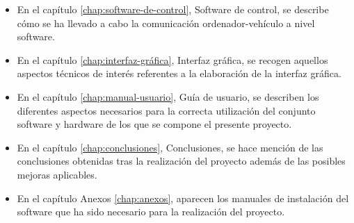 \begin{itemize}
\item En el capítulo \ref{chap:software-de-control}, Software de control, se describe cómo se ha llevado a cabo la comunicación ordenador-vehículo a nivel software.

\item En el capítulo \ref{chap:interfaz-gráfica}, Interfaz gráfica, se recogen aquellos aspectos técnicos de interés referentes a la elaboración de la interfaz gráfica.

\item En el capítulo \ref{chap:manual-usuario}, Guía de usuario, se describen los diferentes aspectos necesarios para la correcta utilización del conjunto software y hardware de los que se compone el presente proyecto.

\item En el capítulo \ref{chap:conclusiones}, Conclusiones, se hace mención de las conclusiones obtenidas tras la realización del proyecto además de las posibles mejoras aplicables.

\item En el capítulo Anexos \ref{chap:anexos}, aparecen los manuales de instalación del software que ha sido necesario para la realización del proyecto.

\end{itemize}
